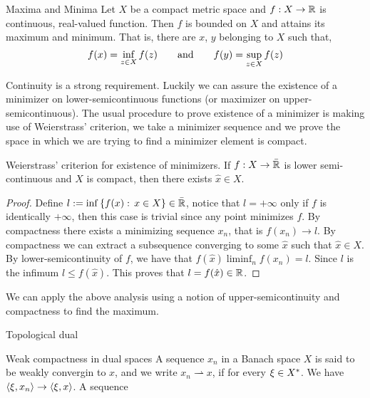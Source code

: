 \begin{theorem}{Maxima and Minima}
	Let $X$ be a compact metric space and $f: X\rightarrow \mathbb{R}$ is continuous, real-valued function. Then $f$ is bounded on $X$ and attains its maximum and minimum. That is, there are $x$, $y$ belonging to $X$ such that,
	\begin{equation*}
		f(x)=\inf_{z\in X}f(z) \qquad \mathrm{and} \qquad f(y)=\sup_{z \in X} f(z)
	\end{equation*}
\end{theorem}
Continuity is a strong requirement. Luckily we can assure the existence of a minimizer on lower-semicontinuous functions (or maximizer on upper-semicontinuous). The usual procedure to prove existence of a minimizer is making use of Weierstrass' criterion, we take a minimizer sequence and we prove the space in which we are trying to find a minimizer element is compact.
\begin{theorem}{Weierstrass' criterion for existence of minimizers.}
	If $f: X\rightarrow\bar{\mathbb{R}}$ is lower semi-continuous and $X$ is compact, then there exists $\hat x \in X$.
	\begin{proof}
		Define $l:=\inf\left\lbrace f(x): \, x \in X \right\rbrace \in \bar{\mathbb{R}}$, notice that $l=+\infty$ only if $f$ is identically $+\infty$, then this case is trivial since any point minimizes $f$. By compactness there exists a minimizing sequence $x_n$, that is $f(x_n)\rightarrow l$. By compactness we can extract a subsequence converging to some $\hat x$ such that $\hat x \in X$. By lower-semicontinuity of $f$, we have that $f(\hat x)\liminf_n f(x_n)=l$. Since $l$ is the infimum $l\leq f(\hat x)$. This proves that $l=f(\hat{x}) \in \mathbb{R}$.
	\end{proof}
\end{theorem}

We can apply the above analysis using a notion of upper-semicontinuity and compactness to find the maximum. 
\begin{definition}{Topological dual}
	
\end{definition}

\begin{definition}{Weak compactness in dual spaces}
	A sequence $x_n$ in a Banach space $X$ is said to be weakly convergin to $x$, and we write $x_n \rightharpoonup x$, if for every $\xi \in {X}^*$. We have $\left\langle \xi, x_n \right\rangle\rightarrow \left\langle \xi, x \right\rangle$. A sequence
\end{definition}

